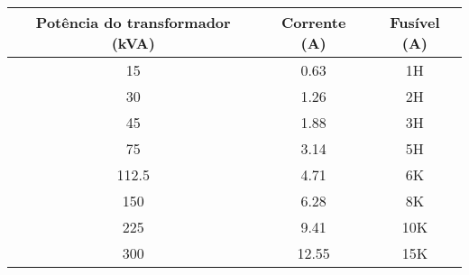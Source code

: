\begin{table}[H]
\centering
\begin{tabular}{|c|c|c|}
\hline
Potência do transformador (kVA) & Corrente (A) & Fusível (A) \\ \hline
15                              & 0.63         & 1H          \\ \hline
30                              & 1.26         & 2H          \\ \hline
45                              & 1.88         & 3H          \\ \hline
75                              & 3.14         & 5H          \\ \hline
112.5                           & 4.71         & 6K          \\ \hline
150                             & 6.28         & 8K          \\ \hline
225                             & 9.41         & 10K         \\ \hline
300                             & 12.55        & 15K         \\ \hline
\end{tabular}
\end{table}